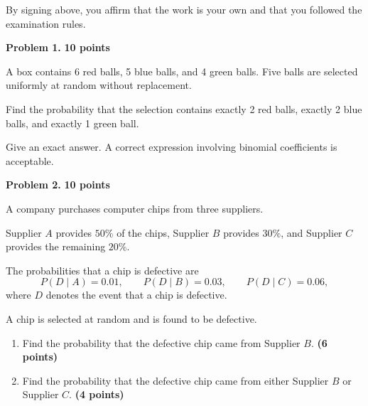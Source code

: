 \documentclass[11pt]{article}
\begin{document}
\begin{titlepage}
\vspace{0.08cm}

{\footnotesize
By signing above, you affirm that the work is your own and that you followed
the examination rules.
}

\end{titlepage}

\begin{problemheader}
\textbf{Problem 1.} \hfill \textbf{10 points}
\end{problemheader}

A box contains 6 red balls, 5 blue balls, and 4 green balls. Five balls
are selected uniformly at random without replacement.

Find the probability that the selection contains exactly 2 red balls,
exactly 2 blue balls, and exactly 1 green ball.

Give an exact answer. A correct expression involving binomial coefficients
is acceptable.

\vspace{7cm}


\newpage


\begin{problemheader}
\textbf{Problem 2.} \hfill \textbf{10 points}
\end{problemheader}

A company purchases computer chips from three suppliers.

Supplier $A$ provides $50\%$ of the chips, Supplier $B$ provides $30\%$,
and Supplier $C$ provides the remaining $20\%$.

The probabilities that a chip is defective are
\[
P(D\mid A)=0.01,\qquad
P(D\mid B)=0.03,\qquad
P(D\mid C)=0.06,
\]
where $D$ denotes the event that a chip is defective.

A chip is selected at random and is found to be defective.

\begin{enumerate}[label=(\alph*),leftmargin=*,itemsep=0.8em]

    \item Find the probability that the defective chip came from
    Supplier $B$.
    \hfill \textbf{(6 points)}

    \item Find the probability that the defective chip came from
    either Supplier $B$ or Supplier $C$.
    \hfill \textbf{(4 points)}

\end{enumerate}
\end{document}
